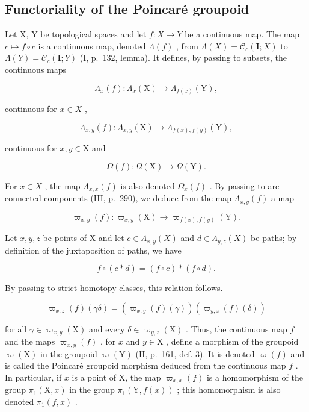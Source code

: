 \subsection{Functoriality of the Poincaré groupoid}

Let X, Y be topological spaces and let \(f: X \to Y\) be a continuous map. The map \(c \mapsto f \circ c\) is a continuous map, denoted \(\Lambda(f)\) , from \(\Lambda(X) = \mathcal{C}_c(\mathbf{I}; X)\) to \(\Lambda(Y) = \mathcal{C}_c(\mathbf{I}; Y)\) (I, p.~132, lemma). It defines, by passing to subsets, the continuous maps

\[
\Lambda_ {x} (f) \colon \Lambda_ {x} (\mathrm{X}) \to \Lambda_ {f (x)} (\mathrm{Y}),
\]

continuous for \(x \in X\) ,

\[
\Lambda_ {x, y} (f) \colon \Lambda_ {x, y} (\mathrm{X}) \to \Lambda_ {f (x), f (y)} (\mathrm{Y}),
\]

continuous for \(x, y \in \mathrm{X}\) and

\[
\Omega (f) \colon \Omega (\mathrm{X}) \to \Omega (\mathrm{Y}).
\]

For \(x \in X\) , the map \(\Lambda_{x,x}(f)\) is also denoted \(\Omega_x(f)\) . By passing to arc-connected components (III, p.~290), we deduce from the map \(\Lambda_{x,y}(f)\) a map

\[
\varpi_ {x, y} (f) \colon \varpi_ {x, y} (\mathrm{X}) \to \varpi_ {f (x), f (y)} (\mathrm{Y}).
\]

Let \(x, y, z\) be points of X and let \(c \in \Lambda_{x,y}(X)\) and \(d \in \Lambda_{y,z}(X)\) be paths; by definition of the juxtaposition of paths, we have

\[
f \circ (c * d) = (f \circ c) * (f \circ d).
\]

By passing to strict homotopy classes, this relation follows.

\[
\varpi_ {x, z} (f) (\gamma \delta) = (\varpi_ {x, y} (f) (\gamma)) (\varpi_ {y, z} (f) (\delta))
\]

 for all \(\gamma \in \varpi_{x,y}(\mathrm{X})\) and every \(\delta \in \varpi_{y,z}(\mathrm{X})\) . Thus, the continuous map \(f\) and the maps \(\varpi_{x,y}(f)\) , for \(x\) and \(y \in \mathrm{X}\) , define a morphism of the groupoid \(\varpi(\mathrm{X})\) in the groupoid \(\varpi(\mathrm{Y})\) (II, p.~161, def. 3). It is denoted \(\varpi(f)\) and is called the Poincaré groupoid morphism deduced from the continuous map \(f\) . In particular, if \(x\) is a point of X, the map \(\varpi_{x,x}(f)\) is a homomorphism of the group \(\pi_1(\mathrm{X}, x)\) in the group \(\pi_1(\mathrm{Y}, f(x))\) ; this homomorphism is also denoted \(\pi_1(f, x)\) .

